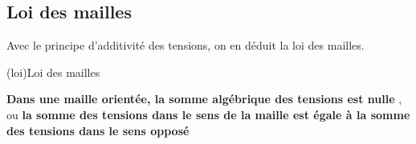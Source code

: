 \documentclass[../../main/main.tex]{subfiles}
\begin{document}
\subsection{Loi des mailles}

Avec le principe d'additivité des tensions, on en déduit la loi des mailles.
\begin{tcb}[label=loi:mailles, sidebyside, halign upper=center](loi){Loi des mailles}

	\textbf{Dans une maille orientée, la somme algébrique des tensions est nulle
	}, ou \textbf{la somme des tensions dans le sens de la maille est égale à la
		somme des tensions dans le sens opposé}
	\tcblower
	\begin{center}
	\end{center}
\end{tcb}
\end{document}
